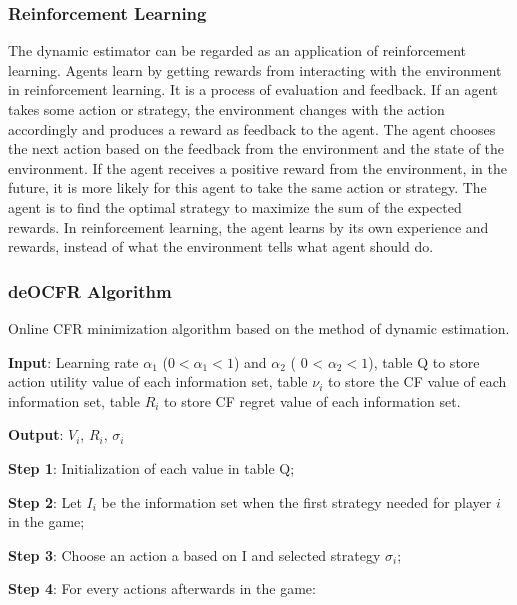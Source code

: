 \documentclass{article}
\begin{document}
\subsubsection{Reinforcement Learning}

The dynamic estimator can be regarded as an application of reinforcement learning. Agents learn by getting rewards from interacting with the environment in reinforcement learning. It is a process of evaluation and feedback. If an agent takes some action or strategy, the environment changes with the action accordingly and produces a reward as feedback to the agent. The agent chooses the next action based on the feedback from the environment and the state of the environment. If the agent receives a positive reward from the environment, in the future, it is more likely for this agent to take the same action or strategy. The agent is to find the optimal strategy to maximize the sum of the expected rewards. In reinforcement learning, the agent learns by its own experience and rewards, instead of what the environment tells what agent should do.

\subsubsection{deOCFR Algorithm}

Online CFR minimization algorithm based on the method of dynamic estimation.

\textbf{Input}: Learning rate $\alpha_1$ ($ 0 < \alpha_1 < 1$) and $\alpha_2$ ( 0 < $\alpha_2 < 1$), table Q to store action utility value of each information set, table $\nu_i$ to store the CF value of each information set, table $R_i$ to store CF regret value of each information set. 

\textbf{Output}: $V_i$, $R_i$, $\sigma_i$

\textbf{Step 1}: Initialization of each value in table Q;

\textbf{Step 2}: Let $I_i$ be the information set when the first strategy needed for player $i$ in the game;

\textbf{Step 3}: Choose an action a based on I and selected strategy $\sigma_i$;

\textbf{Step 4}: For every actions afterwards in the game:
\end{document}
